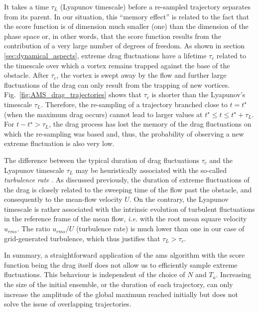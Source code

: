 It takes a time $\tau_L$ (Lyapunov timescale) before a re-sampled trajectory separates from its parent. In our situation, this ``memory effect'' is related to the fact that the score function is of dimension much smaller (one) than the dimension of the phase space or, in other words, that the score function results from the contribution of a very large number of degrees of freedom.  
%
As shown in section \ref{sec:dynamical_aspects}, extreme drag fluctuations have a lifetime $\tau_c$ related to the timescale over which a vortex remains trapped against the base of the obstacle. After $\tau_c$, the vortex is swept away by the flow and further large fluctuations of the drag can only result from the trapping of new vortices.
%
Fig.~\ref{fig:AMS_drag_trajectories} shows that $\tau_c$ is shorter than the Lyapunov's timescale $\tau_L$. 
%
%
Therefore, the re-sampling of a trajectory branched close to $t=t^{\star}$ (when the maximum drag occurs) cannot lead to larger values at $t^{\star} \leq t \leq t^{\star}+\tau_L$.
For $t - t^{\star} >\tau_L$, the drag process has lost the memory of the drag fluctuations on which the re-sampling was based and, thus, the probability of observing a new extreme fluctuation is also very low. 
%
%

The difference between the typical duration of drag fluctuations $\tau_c$ and the Lyapunov timescale $\tau_L$ may be heuristically associated with the so-called \emph{turbulence rate} \citep{frisch_book}.
%
As discussed previously, the duration of extreme fluctuations of the drag is closely related to the sweeping time of the flow past the obstacle, and consequently to the mean-flow velocity $U$. On the contrary, the Lyapunov timescale is rather associated with the intrinsic evolution of turbulent fluctuations in the reference frame of the mean flow, \textit{i.e.} with the root mean square velocity $u_{rms}$. The ratio $u_{rms}/U$ (turbulence rate) is much lower than one in our case of grid-generated turbulence, which thus justifies that $\tau_L > \tau_c$.

%
In summary, a straightforward application of the \ac{ams} algorithm with the score function being the drag itself does not allow us to efficiently sample extreme fluctuations.
%
This behaviour is independent of the choice of $N$ and $T_a$. Increasing the size of the initial ensemble, or the duration of each trajectory, can only increase the amplitude of the global maximum reached initially but does not solve the issue of overlapping trajectories.

